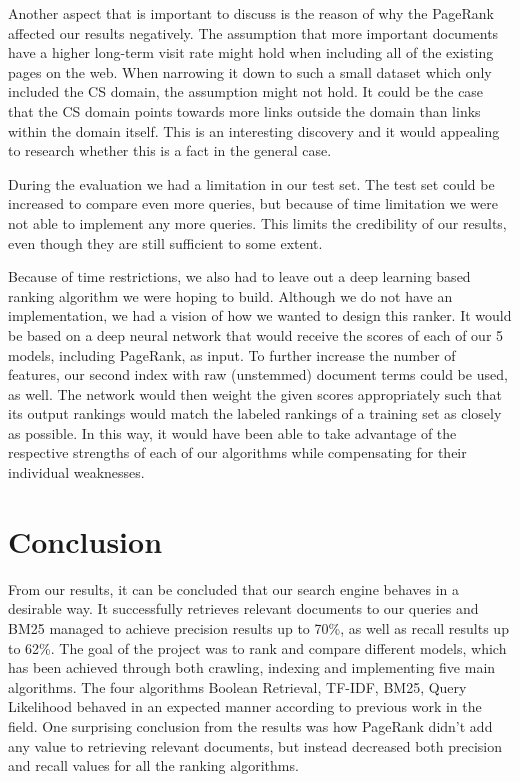 Another aspect that is important to discuss is the reason of why the PageRank affected our results negatively. The assumption that more important documents have a higher long-term visit rate might hold when including all of the existing pages on the web. When narrowing it down to such a small dataset which only included the CS domain, the assumption might not hold. It could be the case that the CS domain points towards more links outside the domain than links within the domain itself. This is an interesting discovery and it would appealing to research whether this is a fact in the general case.

During the evaluation we had a limitation in our test set. The test set could be increased to compare even more queries, but because of time limitation we were not able to implement any more queries. This limits the credibility of our results, even though they are still sufficient to some extent.

Because of time restrictions, we also had to leave out a deep learning based ranking algorithm we were hoping to build. Although we do not have an implementation, we had a vision of how we wanted to design this ranker. It would be based on a deep neural network that would receive the scores of each of our 5 models, including PageRank, as input. To further increase the number of features, our second index with raw (unstemmed) document terms could be used, as well. The network would then weight the given scores appropriately such that its output rankings would match the labeled rankings of a training set as closely as possible. In this way, it would have been able to take advantage of the respective strengths of each of our algorithms while compensating for their individual weaknesses.


\section{Conclusion} %
\label{sec:conclusion}

From our results, it can be concluded that our search engine behaves in a desirable way. It successfully retrieves relevant documents to our queries and BM25 managed to achieve precision results up to 70\%, as well as recall results up to 62\%. The goal of the project was to rank and compare different models, which has been achieved through both crawling, indexing and implementing five main algorithms. The four algorithms Boolean Retrieval, TF-IDF, BM25, Query Likelihood behaved in an expected manner according to previous work in the field. One surprising conclusion from the results was how PageRank didn't add any value to retrieving relevant documents, but instead decreased both precision and recall values for all the ranking algorithms. 

